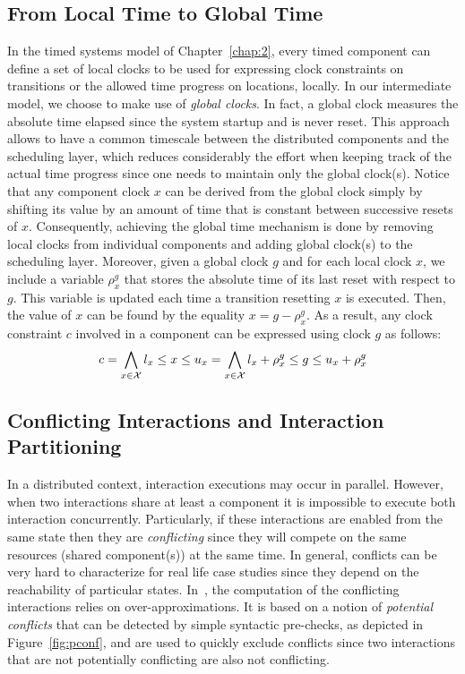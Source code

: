 \subsection{From Local Time to Global Time}
In the timed systems model of Chapter~\ref{chap:2}, every timed component can define a set of 
local clocks to be used for expressing clock constraints on transitions or the allowed time 
progress on locations, locally. In our intermediate model, we choose to make use of \emph{global 
clocks}.
In fact, a global clock measures the absolute time elapsed since the system startup and is never
reset. This approach allows to have a common timescale between the distributed components
and the scheduling layer, which reduces considerably the effort when keeping track of the
actual time progress since one needs to maintain only the global clock(s). 
Notice that any component clock $x$ can be derived from the global clock simply by shifting its 
value by an amount of time that is constant between successive resets of $x$. 
Consequently, achieving 
the global time mechanism is done by removing local clocks from individual components 
and adding global clock(s) to the scheduling layer. Moreover, given a global clock $g$ 
and for each local clock $x$,
we include a variable $\rho_x^g$ that stores the absolute time of its last reset with respect
to $g$. This variable is updated each time a transition resetting $x$ 
is executed. Then, the value of $x$ can be found by the equality $x=g-\rho_x^g$.  
As a result, any clock constraint $c$ involved in a component can be expressed using clock $g$
as follows:
\begin{equation}\label{eq:g_clk}
  c=\bigwedge_{x\in\mathcal{X}} l_x\le x\le u_x=\bigwedge_{x\in\mathcal{X}}l_x+\rho_x^g\le g\le u_x+\rho_x^g
\end{equation}

\subsection{Conflicting Interactions and Interaction Partitioning}
\label{sub:conf}
In a distributed context, interaction executions may occur in parallel. However,
when two interactions share at least a component it is impossible to execute both
interaction concurrently. Particularly, if these interactions are enabled from the same state 
then they are \emph{conflicting} since they will compete on the same resources (shared 
component(s)) at the same time.
In general, conflicts can be very hard to characterize for real life case studies since 
they depend on the reachability of particular states. In~\cite{ahlem_these,conf_free}, 
the computation of
the conflicting interactions relies on over-approximations. It is based on a notion 
of \emph{potential conflicts} that can be detected by simple syntactic pre-checks, as depicted
in Figure~\ref{fig:pconf}, and are used to quickly exclude conflicts since two interactions
that are not potentially conflicting are also not conflicting. 

